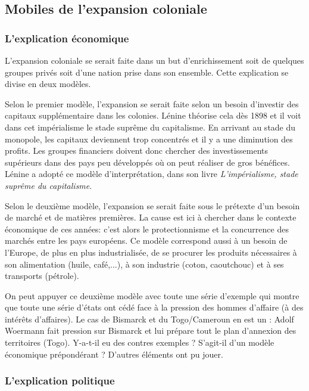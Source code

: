 \documentclass[12pt]{report}
\begin{document}
\subsection{Mobiles de l'expansion coloniale}

\subsubsection{L'explication économique}

L’expansion coloniale se serait faite dans un but d’enrichissement soit de quelques groupes
privés soit d’une nation prise dans son ensemble.
Cette explication se divise en deux modèles.

Selon le premier modèle, l’expansion se serait faite selon un besoin d’investir des capitaux supplémentaire dans
les colonies. Lénine théorise cela dès 1898 et il voit dans cet impérialisme le stade
suprême du capitalisme. En arrivant au stade du monopole, les capitaux deviennent
trop concentrés et il y a une diminution des profits. Les groupes financiers doivent
donc chercher des investissements supérieurs dans des pays peu développés où on peut
réaliser de gros bénéfices. Lénine a adopté ce modèle d'interprétation, dans son livre \emph{L'impérialisme, stade suprême du capitalisme}.

Selon le deuxième modèle, l’expansion se serait faite sous le prétexte d'un besoin de marché et de matières premières. La
cause est ici à chercher dans le contexte économique de ces années: c’est alors le
protectionnisme et la concurrence des marchés entre les pays européens. Ce modèle
correspond aussi à un besoin de l’Europe, de plus en plus industrialisée, de se procurer
les produits nécessaires à son alimentation (huile, café,...), à son industrie (coton,
caoutchouc) et à ses transports (pétrole).

On peut appuyer ce deuxième modèle avec toute une série d’exemple qui montre que toute
une série d’états ont cédé face à la pression des hommes d’affaire (à des intérêts d’affaires).
Le cas de Bismarck et du Togo/Cameroun en est un : Adolf Woermann fait pression sur
Bismarck et lui prépare tout le plan d’annexion des territoires (Togo). Y-a-t-il eu des contres
exemples ? S’agit-il d’un modèle économique prépondérant ? D’autres éléments ont pu jouer.

\subsubsection{L'explication politique}
\end{document}
